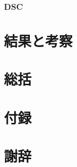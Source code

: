 \documentclass[dvipdfmx,12pt,a4paper]{jreport}
\begin{document}
			\newpage
			\subsection{DSC}
	\chapter{結果と考察}
	\chapter{総括}
	\chapter{付録}
	\chapter*{謝辞}
	
\end{document}
